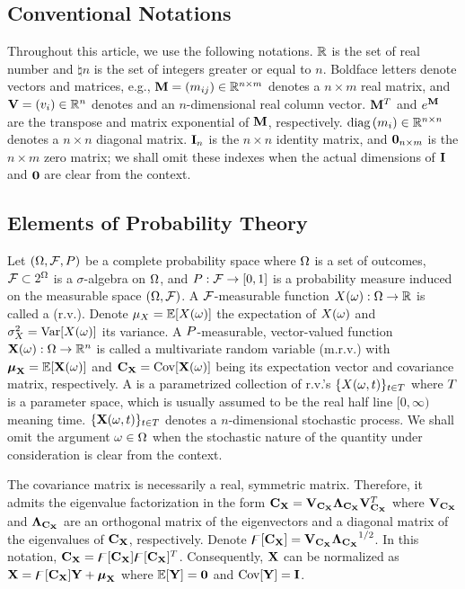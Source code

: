 \subsection{Conventional Notations}
Throughout this article, we use the following notations. $\mathbb{R}$ is the set of real number and $\natural{n}$ is the set of integers greater or equal to $n$. Boldface letters denote vectors and matrices, e.g., $\m{M} = \mtx{m_{ij}} \in \real^{n \times m}$ denotes a $n \times m$ real matrix, and $\mathbf{V} = (v_i) \in \mathbb{R}^n$ denotes and an $n$-dimensional real column vector. $\m{M}^T$ and $e^\m{M}$ are the transpose and matrix exponential of $\m{M}$, respectively. $\text{diag}\left(m_i\right) \in \mathbb{R}^{n \times n}$ denotes a $n \times n$ diagonal matrix. $\mI_n$ is the $n \times n$ identity matrix, and $\mZ_{n \times m}$ is the $n \times m$ zero matrix; we shall omit these indexes when the actual dimensions of $\mI$ and $\mZ$ are clear from the context.

\subsection{Elements of Probability Theory}
Let $(\Omega, \mathcal{F}, P)$ be a complete probability space \cite{durrett2010} where $\Omega$ is a set of outcomes, $\mathcal{F} \subset 2^\Omega$ is a $\sigma$-algebra on $\Omega$, and $P: \mathcal{F} \to [0, 1]$ is a probability measure induced on the measurable space $(\Omega, \mathcal{F})$. A $\mathcal{F}$-measurable function $\rv{X}(\o): \outcomes \to \real$ is called a  (r.v.). Denote $\exp_\rv{X} = \oExp{\rv{X}(\o)}$ the expectation of $\rv{X}(\o)$ and $\var_\rv{X} = \oVar{\rv{X}(\o)}$ its variance. A $P$-measurable, vector-valued function $\mrv{X}(\o): \outcomes \to \real^n$ is called a multivariate random variable (m.r.v.) with $\vExp_\mrv{X} = \oExp{\mrv{X}(\o)}$ and $\mCov_\mrv{X} = \oCov{\mrv{X}(\o)}$ being its expectation vector and covariance matrix, respectively. A  is a parametrized collection of r.v.'s $\{ \rv{X}(\o, \t) \}_{\t \in \sTime}$ where $T$ is a parameter space, which is usually assumed to be the real half line $[0, \infty)$ meaning time. $\{ \mrv{X}(\o, \t) \}_{\t \in \sTime}$ denotes a $n$-dimensional stochastic process. We shall omit the argument $\omega \in \Omega$ when the stochastic nature of the quantity under consideration is clear from the context.

The covariance matrix is necessarily a real, symmetric matrix. Therefore, it admits the eigenvalue factorization \cite{press2007} in the form $\mCov_\mrv{X} = \m{V}_{\mCov_\mrv{X}} \m{\Lambda}_{\mCov_\mrv{X}} \m{V}_{\mCov_\mrv{X}}^T$ where $\m{V}_{\mCov_\mrv{X}}$ and $\m{\Lambda}_{\mCov_\mrv{X}}$ are an orthogonal matrix of the eigenvectors and a diagonal matrix of the eigenvalues of $\mCov_\mrv{X}$, respectively. Denote $\oEigen{\mCov_\mrv{X}} = \m{V}_{\mCov_\mrv{X}} {\m{\Lambda}_{\mCov_\mrv{X}}}^\ifrac{1}{2}$. In this notation, $\mCov_\mrv{X} = \oEigen{\mCov_\mrv{X}} \oEigen{\mCov_\mrv{X}}^T$. Consequently, $\mrv{X}$ can be normalized as $\mrv{X} = \oEigen{\mCov_\mrv{X}} \mrv{y} + \vExp_\mrv{X}$ where $\oExp{\mrv{y}} = \mZ$ and $\oCov{\mrv{y}} = \mI$.

